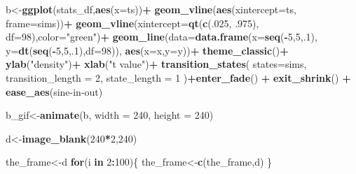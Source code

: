 \documentclass[
]{book}
\newenvironment{Shaded}{\begin{snugshade}}{\end{snugshade}}
\newcommand{\AttributeTok}[1]{\textcolor[rgb]{0.13,0.29,0.53}{#1}}
\newcommand{\ControlFlowTok}[1]{\textcolor[rgb]{0.13,0.29,0.53}{\textbf{#1}}}
\newcommand{\DecValTok}[1]{\textcolor[rgb]{0.00,0.00,0.81}{#1}}
\newcommand{\FunctionTok}[1]{\textcolor[rgb]{0.13,0.29,0.53}{\textbf{#1}}}
\newcommand{\NormalTok}[1]{#1}
\newcommand{\OtherTok}[1]{\textcolor[rgb]{0.56,0.35,0.01}{#1}}
\newcommand{\SpecialCharTok}[1]{\textcolor[rgb]{0.81,0.36,0.00}{\textbf{#1}}}
\newcommand{\StringTok}[1]{\textcolor[rgb]{0.31,0.60,0.02}{#1}}
\begin{document}
\begin{Shaded}
\begin{Highlighting}[]
\NormalTok{b}\OtherTok{\textless{}{-}}\FunctionTok{ggplot}\NormalTok{(stats\_df,}\FunctionTok{aes}\NormalTok{(}\AttributeTok{x=}\NormalTok{ts))}\SpecialCharTok{+}
  \FunctionTok{geom\_vline}\NormalTok{(}\FunctionTok{aes}\NormalTok{(}\AttributeTok{xintercept=}\NormalTok{ts, }\AttributeTok{frame=}\NormalTok{sims))}\SpecialCharTok{+}
  \FunctionTok{geom\_vline}\NormalTok{(}\AttributeTok{xintercept=}\FunctionTok{qt}\NormalTok{(}\FunctionTok{c}\NormalTok{(.}\DecValTok{025}\NormalTok{, .}\DecValTok{975}\NormalTok{), }\AttributeTok{df=}\DecValTok{98}\NormalTok{),}\AttributeTok{color=}\StringTok{"green"}\NormalTok{)}\SpecialCharTok{+}
  \FunctionTok{geom\_line}\NormalTok{(}\AttributeTok{data=}\FunctionTok{data.frame}\NormalTok{(}\AttributeTok{x=}\FunctionTok{seq}\NormalTok{(}\SpecialCharTok{{-}}\DecValTok{5}\NormalTok{,}\DecValTok{5}\NormalTok{,.}\DecValTok{1}\NormalTok{),}
                            \AttributeTok{y=}\FunctionTok{dt}\NormalTok{(}\FunctionTok{seq}\NormalTok{(}\SpecialCharTok{{-}}\DecValTok{5}\NormalTok{,}\DecValTok{5}\NormalTok{,.}\DecValTok{1}\NormalTok{),}\AttributeTok{df=}\DecValTok{98}\NormalTok{)),}
            \FunctionTok{aes}\NormalTok{(}\AttributeTok{x=}\NormalTok{x,}\AttributeTok{y=}\NormalTok{y))}\SpecialCharTok{+}
  \FunctionTok{theme\_classic}\NormalTok{()}\SpecialCharTok{+}
  \FunctionTok{ylab}\NormalTok{(}\StringTok{"density"}\NormalTok{)}\SpecialCharTok{+}
  \FunctionTok{xlab}\NormalTok{(}\StringTok{"t value"}\NormalTok{)}\SpecialCharTok{+}
  \FunctionTok{transition\_states}\NormalTok{(}
    \AttributeTok{states=}\NormalTok{sims,}
    \AttributeTok{transition\_length =} \DecValTok{2}\NormalTok{,}
    \AttributeTok{state\_length =} \DecValTok{1}
\NormalTok{  )}\SpecialCharTok{+}\FunctionTok{enter\_fade}\NormalTok{() }\SpecialCharTok{+} 
  \FunctionTok{exit\_shrink}\NormalTok{() }\SpecialCharTok{+}
  \FunctionTok{ease\_aes}\NormalTok{(}\StringTok{\textquotesingle{}sine{-}in{-}out\textquotesingle{}}\NormalTok{)}

\NormalTok{b\_gif}\OtherTok{\textless{}{-}}\FunctionTok{animate}\NormalTok{(b, }\AttributeTok{width =} \DecValTok{240}\NormalTok{, }\AttributeTok{height =} \DecValTok{240}\NormalTok{)}


\NormalTok{d}\OtherTok{\textless{}{-}}\FunctionTok{image\_blank}\NormalTok{(}\DecValTok{240}\SpecialCharTok{*}\DecValTok{2}\NormalTok{,}\DecValTok{240}\NormalTok{)}

\NormalTok{the\_frame}\OtherTok{\textless{}{-}}\NormalTok{d}
\ControlFlowTok{for}\NormalTok{(i }\ControlFlowTok{in} \DecValTok{2}\SpecialCharTok{:}\DecValTok{100}\NormalTok{)\{}
\NormalTok{  the\_frame}\OtherTok{\textless{}{-}}\FunctionTok{c}\NormalTok{(the\_frame,d)}
\NormalTok{\}}


\end{Highlighting}
\end{Shaded}
\end{document}

